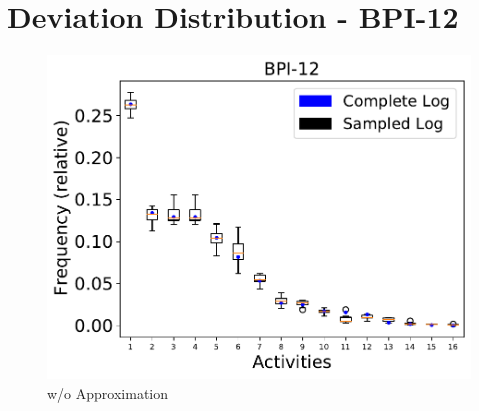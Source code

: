\documentclass[landscape]{article}
\begin{document}
\section*{Deviation Distribution - BPI-12}
\begin{figure}[!htb]
	\centering
	\begin{minipage}{0.2\textwidth}
		\includegraphics[width=1.0\textwidth]{../BPI_Challenge_2012/BPI_Challenge_2012_deviations.pdf}
		\caption{w/o Approximation}
	\end{minipage}
\end{figure}
\end{document}
